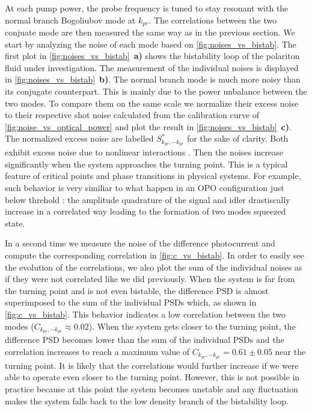 At each pump power, the probe frequency is tuned to stay resonant with the normal branch Bogoliubov mode at $k_{pr}$. The correlations between the two conjuate mode are then measured the same way as in the previous section. 
We start by analyzing the noise of each mode based on \autoref{fig:noises_vs_bistab}. The first plot in \autoref{fig:noises_vs_bistab}~\textbf{a)} shows the bistability loop of the polariton fluid under investigation. 
The measurement of the individual noises is displayed in \autoref{fig:noises_vs_bistab}~\textbf{b)}. The normal branch mode is much more noisy than its conjugate counterpart. This is mainly due to the power unbalance between the two modes. To compare them 
on the same scale we normalize their excess noise to their respective shot noise calculated from the calibration curve of \autoref{fig:noise_vs_optical_power} and plot the result in \autoref{fig:noises_vs_bistab}~\textbf{c)}. The normalized excess noise are labelled $S_{k_{pr},-k_{pr}}^*$ for the sake of clarity. Both exhibit excess noise due to nonlinear interactions \cite{a_baas_quantum_degeneracy2006}. Then the noises increase significantly when the system
approaches the turning point. This is a typical feature of critical points and phase transitions in physical systems. For example, such behavior is very similiar to what happen in an OPO configuration just below threhold \cite{Zhang:06} : the amplitude quadrature of the signal and idler drastiscally increase in a correlated way
leading to the formation of two modes squeezed state. 

\bigskip


In a second time we measure the noise of the difference photocurrent and compute the corresponding correlation in \autoref{fig:c_vs_bistab}. In order to easily see the evolution of the correlations, we also plot the sum of the individual noises as if they were not correlated like we did previously. When the system is far from the turning point and is not even bistable, the difference PSD is almost superimposed to the sum of the individual PSDs which, as shown in \autoref{fig:c_vs_bistab}. This behavior indicates a low correlation between the two modes ($C_{k_{pr},-k_{pr}}\approx0.02$).
When the system gets closer to the turning point, the difference PSD becomes lower than the sum of the individual PSDs and the correlation increases to reach a maximum value of $C_{k_{pr},-k_{pr}}=0.61\pm0.05$ near the turning point. It is likely that the correlations would further increase if we were able to operate even closer to the turning point. However, this is not possible in practice because at this point the system becomes
unstable and any fluctuation makes the system falls back to the low density branch of the bistability loop.

